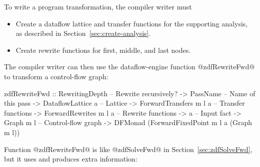 \documentclass[blockstyle,preprint,natbib,nocopyrightspace]{sigplanconf}
\newcommand\secref[1]{Section~\ref{sec:#1}}
\newcommand\seclabel[1]{\label{sec:#1}}
\begin{document}
To write a program transformation,
the compiler writer must 
\begin{itemize}
\item
Create a dataflow lattice and transfer functions for the supporting
analysis, as described in \secref{create-analysis}. 
\item
Create rewrite functions for first, middle, and last nodes.
\end{itemize}
The
compiler writer can then use the 
dataflow-engine function @zdfRewriteFwd@ to transform a control-flow
graph:
\begin{code}
  zdfRewriteFwd 
    :: RewritingDepth         -- Rewrite recursively?
    -> PassName               -- Name of this pass
    -> DataflowLattice a      -- Lattice
    -> ForwardTransfers m l a -- Transfer functions
    -> ForwardRewrites m l a  -- Rewrite functions
    -> a                      -- Input fact
    -> Graph m l              -- Control-flow graph
    -> DFMonad (ForwardFixedPoint m l a (Graph m l))
\end{code}
Function @zdfRewriteFwd@ is like @zdfSolveFwd@ in
\secref{zdfSolveFwd}, but it uses and produces extra
information:\seclabel{engine-truth} 
\end{document}
